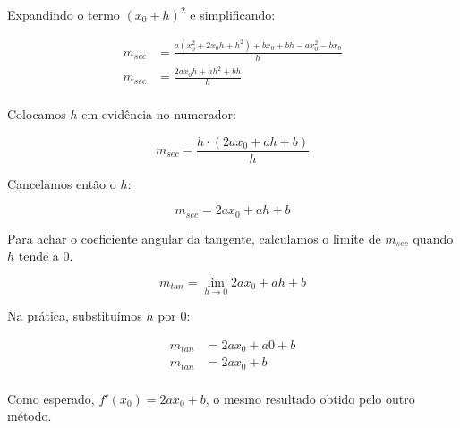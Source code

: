 \documentclass[../resumo.tex]{subfiles}
\begin{document}
	Expandindo o termo $(x_0+h)^2$ e simplificando:

	\begin{align*}
		m_{sec} &= \frac{a(x_0^2 + 2x_0h + h^2) + bx_0 + bh - ax_0^2 - bx_0}{h} \\
		m_{sec} &= \frac{2ax_0h + ah^2 + bh}{h} \\
	\end{align*}

	Colocamos $h$ em evidência no numerador:

	\[ m_{sec} = \frac{h \cdot (2ax_0 + ah + b)}{h} \]

	Cancelamos então o $h$:

	\[ m_{sec} = 2ax_0 + ah + b \]

	Para achar o coeficiente angular da tangente, calculamos o limite de $m_{sec}$ quando $h$ tende a $0$.

	\[ m_{tan} = \lim_{h \to 0} 2ax_0 + ah + b \]

	Na prática, substituímos $h$ por $0$:

	\begin{align*}
		m_{tan} &= 2ax_0 + a0 + b \\
		m_{tan} &= 2ax_0 + b \\
	\end{align*}

	Como esperado, $f'(x_0) = 2ax_0 + b$, o mesmo resultado obtido pelo outro método.
\end{document}
